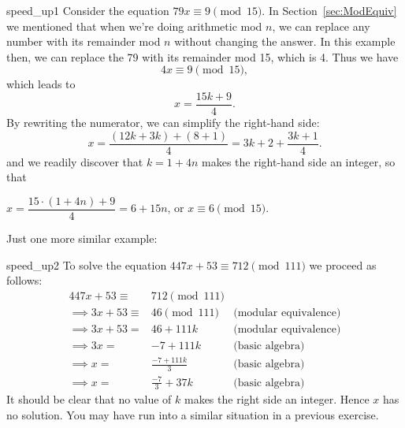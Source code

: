\begin{example}{speed_up1}
Consider the equation $79x \equiv 9 \pmod{15}$. In Section~\ref{sec:ModEquiv} we mentioned that when we're doing arithmetic mod $n$, we can replace any number with its remainder mod $n$ without changing the answer. In this example then, we can replace the 79 with its remainder mod 15, which is 4. Thus we have
\[ 4x \equiv 9 \pmod{15}, \]
which leads to 
\[ x = \dfrac{15k +9}{4}. \]
By rewriting the numerator, we can simplify the right-hand side:
\[ x = \dfrac{(12k + 3k) + (8 + 1)}{4} = 3k + 2 + \dfrac{3k + 1}{4}. \]
and we readily discover that $k=1 + 4n$ makes the right-hand side an integer, so that 

\begin{center}
$x = \dfrac{15\cdot(1+4n) +9}{4} = 6+15n$, or $x \equiv 6 \pmod{15}$.
\end{center}

\end{example}

Just one more similar example:

\begin{example}{speed_up2}
To solve the equation $447x + 53 \equiv 712 \pmod{111}$ we proceed as follows:
\begin{align*}
447x + 53 \equiv& 712 \pmod{111} \\
\implies 3x + 53 \equiv& 46 \pmod{111} &\text{(modular equivalence)} \\
 \implies 3x + 53 =& 46 + 111k &\text{(modular equivalence)}\\ 
 \implies 3x  =& -7 + 111k &\text{(basic algebra)}\\ 
 \implies x =& \frac{-7 +111k}{3} &\text{(basic algebra)}\\
 \implies x =& \frac{-7}{3} + 37k &\text{(basic algebra)}
 \end{align*}
It should be clear that no value of $k$  makes the right side an integer.  Hence $x$ has no solution. You may have run into a similar situation in a previous exercise.
\end{example}

